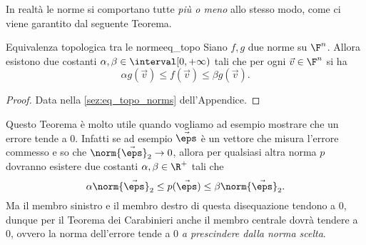 In realtà le norme si comportano tutte \emph{più o meno} allo stesso modo, come ci viene garantito dal seguente Teorema.
\begin{theorem}{Equivalenza topologica tra le norme}{eq_topo}
    Siano $f, g$ due norme su $\F^n$. Allora esistono due costanti $\alpha, \beta \in \interval[{0, +\infty})$ tali che per ogni $\vec v \in \F^n$ si ha  \[
        \alpha g(\vec v) \leq f(\vec v) \leq \beta g(\vec v).
    \]
\end{theorem}
\begin{proof}
    Data nella \autoref{sez:eq_topo_norms} dell'Appendice.
\end{proof}

Questo Teorema è molto utile quando vogliamo ad esempio mostrare che un errore tende a $0$. Infatti se ad esempio $\vec \eps$ è un vettore che misura l'errore commesso e so che $\norm{\vec \eps}_2 \to 0$, allora per qualsiasi altra norma $p$ dovranno esistere due costanti $\alpha, \beta \in \R^+$ tali che \[
    \alpha\norm{\vec \eps}_2 \leq p(\vec \eps) \leq \beta\norm{\vec \eps}_2.
\] Ma il membro sinistro e il membro destro di questa disequazione tendono a $0$, dunque per il Teorema dei Carabinieri anche il membro centrale dovrà tendere a $0$, ovvero la norma dell'errore tende a $0$ \emph{a prescindere dalla norma scelta}.